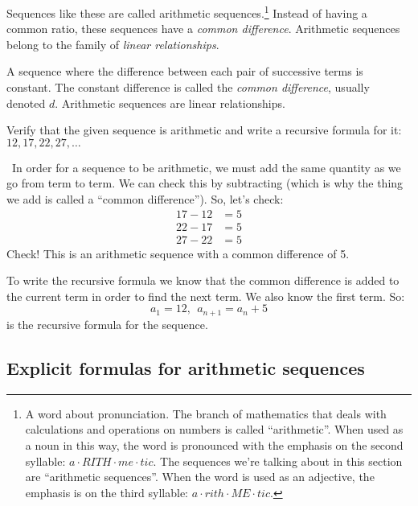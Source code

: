 Sequences like these are called \glspl{arithmetic sequence}.\footnote{A word about pronunciation. The branch of mathematics that deals with calculations and operations on numbers is called ``arithmetic''. When used as a noun in this way, the word is pronounced with the emphasis on the second syllable: $a \cdot RITH \cdot me \cdot tic$. The sequences we're talking about in this section are ``arithmetic sequences''. When the word is used as an adjective, the emphasis is on the third syllable: $a \cdot rith \cdot ME \cdot tic$.} Instead of having a common ratio, these sequences have a \textit{common difference}. Arithmetic sequences belong to the family of \textit{linear relationships}.

\begin{boxeddef}
A sequence where the difference between each pair of successive terms is constant. The constant difference is called the \textit{common difference}, usually denoted $d$. Arithmetic sequences are linear relationships.
\end{boxeddef}

\begin{boxedex}
Verify that the given sequence is arithmetic and write a recursive formula for it: $12, 17, 22, 27, \dotsc$

\exsoln\ In order for a sequence to be arithmetic, we must add the same quantity as we go from term to term. We can check this by subtracting (which is why the thing we add is called a ``common difference''). So, let's check: \[\begin{aligned}17-12 &= 5\\22-17 &= 5\\27-22 &= 5\end{aligned}\]
Check! This is an arithmetic sequence with a common difference of 5.

To write the recursive formula we know that the common difference is added to the current term in order to find the next term. We also know the first term. So: \[a_1 = 12, ~~ a_{n+1} = a_n + 5\]
is the recursive formula for the sequence.
\end{boxedex}

\subsection{Explicit formulas for arithmetic sequences}

